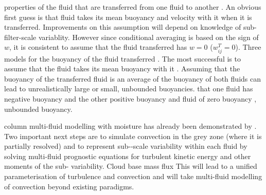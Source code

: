 \documentclass[draft]{agujournal2019}
\begin{document}
 properties of the fluid that are transferred from one fluid to another . An obvious
first guess is that fluid takes its mean buoyancy and velocity
with it when it is transferred.
{Improvements on this assumption will depend on knowledge of sub-filter-scale variablity. However since conditional averaging is based on the sign of $w$, it is consistent to assume that the fluid transferred has $w=0$ ($w_{ij}^T=0$).}
Three models for the buoyancy of the fluid transferred 
. The most successful
is to assume that the fluid takes its mean buoyancy with it
.
Assuming that the buoyancy of the transferred fluid is an average of the buoyancy of both fluids  can lead to unrealistically large or small, unbounded buoyancies. 
that one fluid has negative buoyancy and the other positive buoyancy and 
fluid of zero buoyancy , unbounded buoyancy. 

 column multi-fluid modelling with moisture has already been demonstrated by  
.
Two important next steps are to simulate convection in the grey zone (where it is partially resolved) and to represent sub--scale variability within each fluid by solving multi-fluid prognostic equations for turbulent kinetic energy and other moments of the sub- variability. 
Cloud base mass flux 
This will lead
to a unified parameterisation of turbulence and convection and will
take multi-fluid modelling of convection beyond existing paradigms. 
\end{document}
